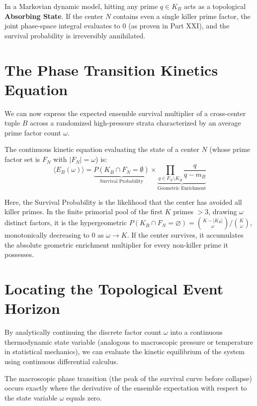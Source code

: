 \documentclass[11pt,a4paper]{article}
\begin{document}
In a Markovian dynamic model, hitting any prime $q \in K_B$ acts as a topological \textbf{Absorbing State}. If the center $N$ contains even a single killer prime factor, the joint phase-space integral evaluates to 0 (as proven in Part XXI), and the survival probability is irreversibly annihilated.

\section{The Phase Transition Kinetics Equation}

We can now express the expected ensemble survival multiplier of a cross-center tuple $B$ across a randomized high-pressure strata characterized by an average prime factor count $\omega$.

The continuous kinetic equation evaluating the state of a center $N$ (whose prime factor set is $F_N$ with $|F_N| = \omega$) is:
\begin{equation}
\langle E_B(\omega) \rangle = \underbrace{P(K_B \cap F_N = \emptyset)}_{\text{Survival Probability}} \times \underbrace{\prod_{q \in F_N \setminus K_B} \frac{q}{q-m_B}}_{\text{Geometric Enrichment}}
\end{equation}

Here, the Survival Probability is the likelihood that the center has avoided all killer primes. In the finite primorial pool of the first $K$ primes $>3$, drawing $\omega$ distinct factors, it is the hypergeometric $P(K_B\cap F_N=\varnothing)=\binom{K-|K_B|}{\omega}/\binom{K}{\omega}$, monotonically decreasing to $0$ as $\omega\to K$. If the center survives, it accumulates the absolute geometric enrichment multiplier for every non-killer prime it possesses.

\section{Locating the Topological Event Horizon}

By analytically continuing the discrete factor count $\omega$ into a continuous thermodynamic state variable (analogous to macroscopic pressure or temperature in statistical mechanics), we can evaluate the kinetic equilibrium of the system using continuous differential calculus.

The macroscopic phase transition (the peak of the survival curve before collapse) occurs exactly where the derivative of the ensemble expectation with respect to the state variable $\omega$ equals zero.
\end{document}
